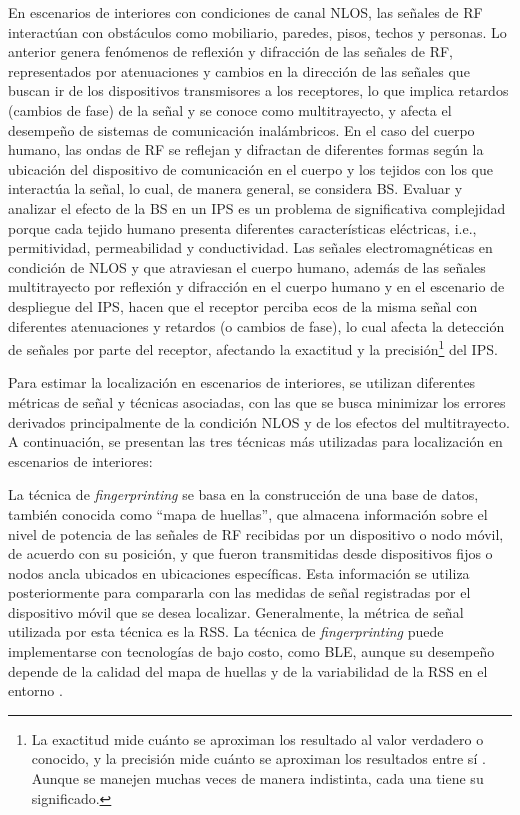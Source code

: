 %
En escenarios de interiores con condiciones de canal NLOS, las señales de RF interactúan con obstáculos como mobiliario, paredes, pisos, techos y personas. Lo anterior genera fenómenos de reflexión y difracción de las señales de RF, representados por atenuaciones y cambios en la dirección de las señales que buscan ir de los dispositivos transmisores a los receptores, lo que implica retardos (cambios de fase) de la señal y se conoce como multitrayecto, y afecta el desempeño de sistemas de comunicación inalámbricos. En el caso del cuerpo humano, las ondas de RF se reflejan y difractan de diferentes formas según la ubicación del dispositivo de comunicación en el cuerpo y los tejidos con los que interactúa la señal, lo cual, de manera general, se considera BS. Evaluar y analizar el efecto de la BS en un IPS es un problema de significativa complejidad porque cada tejido humano presenta diferentes características eléctricas, i.e., permitividad, permeabilidad y conductividad. Las señales electromagnéticas en condición de NLOS y que atraviesan el cuerpo humano, además de las señales multitrayecto por reflexión y difracción en el cuerpo humano y en el escenario de despliegue del IPS, hacen que el receptor perciba ecos de la misma señal con diferentes atenuaciones y retardos (o cambios de fase), lo cual afecta la detección de señales por parte del receptor, afectando la exactitud y la precisión\footnote{La exactitud mide cuánto se aproximan los resultado al valor verdadero o conocido, y la precisión mide cuánto se aproximan los resultados entre sí \cite{ref5}. Aunque se manejen muchas veces de manera indistinta, cada una tiene su significado.} del IPS.

Para estimar la localización en escenarios de interiores, se utilizan diferentes métricas de señal y técnicas asociadas, con las que se busca minimizar los errores derivados principalmente de la condición NLOS y de los efectos del multitrayecto. A continuación, se presentan las tres técnicas más utilizadas para localización en escenarios de interiores:

La técnica de \textit{fingerprinting} se basa en la construcción de una base de datos, también conocida como “mapa de huellas”, que almacena información sobre el nivel de potencia de las señales de RF recibidas por un dispositivo o nodo móvil, de acuerdo con su posición, y que fueron transmitidas desde dispositivos fijos o nodos ancla ubicados en ubicaciones específicas. Esta información se utiliza posteriormente para compararla con las medidas de señal registradas por el dispositivo móvil que se desea localizar. Generalmente, la métrica de señal utilizada por esta técnica es la RSS. La técnica de \textit{fingerprinting} puede implementarse con tecnologías de bajo costo, como BLE, aunque su desempeño depende de la calidad del mapa de huellas y de la variabilidad de la RSS en el entorno \cite{ref6, ref7}.

